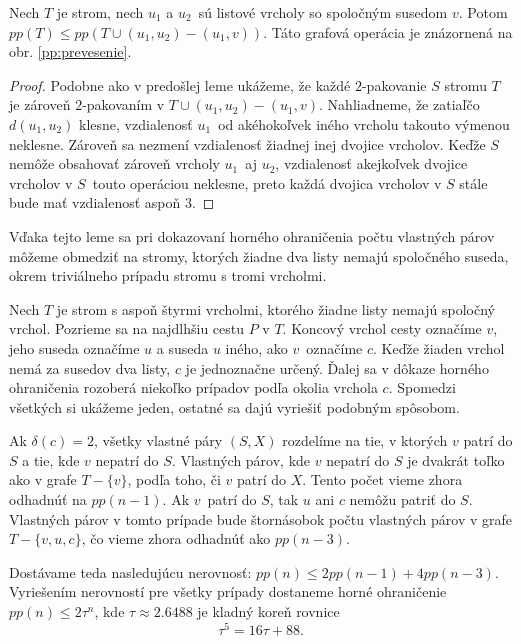 \begin{lema}
   Nech $T$ je strom, nech $u_1$ a $u_2$ sú listové vrcholy so spoločným susedom $v$. Potom
   $pp(T) \leq pp(T \cup (u_1, u_2) - (u_1, v))$. Táto grafová operácia je znázornená na
   obr. \ref{pp:prevesenie}.
\end{lema}

\begin{proof}
    Podobne ako v predošlej leme ukážeme, že každé $2$-pakovanie $S$ stromu $T$ je zároveň $2$-pakovaním
    v $T \cup (u_1, u_2) - (u_1, v)$. Nahliadneme, že zatiaľčo $d(u_1, u_2)$ klesne, vzdialenosť
    $u_1$ od akéhokoľvek iného vrcholu takouto výmenou neklesne. Zároveň sa nezmení vzdialenosť
    žiadnej inej dvojice vrcholov. Keďže $S$ nemôže obsahovať zároveň vrcholy $u_1$ aj $u_2$,
    vzdialenosť akejkoľvek dvojice vrcholov v $S$ touto operáciou neklesne, preto každá dvojica
    vrcholov v $S$ stále bude mať vzdialenosť aspoň $3$.
\end{proof}

Vďaka tejto leme sa pri dokazovaní horného ohraničenia počtu vlastných párov môžeme obmedziť
na stromy, ktorých žiadne dva listy nemajú spoločného suseda, okrem triviálneho prípadu
stromu s tromi vrcholmi.

Nech $T$ je strom s aspoň štyrmi vrcholmi, ktorého žiadne listy nemajú spoločný vrchol. Pozrieme
sa na najdlhšiu cestu $P$ v $T$. Koncový vrchol cesty označíme $v$, jeho suseda označíme $u$ a suseda $u$
iného, ako $v$ označíme $c$. Keďže žiaden vrchol nemá za susedov dva listy, $c$ je jednoznačne určený.
Ďalej sa v dôkaze horného ohraničenia rozoberá niekoľko prípadov podľa okolia vrchola $c$. Spomedzi
všetkých si ukážeme jeden, ostatné sa dajú vyriešiť podobným spôsobom.

Ak $\delta(c) = 2$, všetky vlastné páry $(S,X)$ rozdelíme na tie,
v ktorých $v$ patrí do $S$ a tie, kde $v$ nepatrí do $S$. Vlastných párov, kde $v$ nepatrí do $S$ je
dvakrát toľko ako v grafe $T - \{v\}$, podľa toho, či $v$ patrí do $X$. Tento počet vieme zhora
odhadnúť na $pp(n-1)$. Ak $v$ patrí do $S$, tak $u$ ani $c$ nemôžu patriť do $S$. Vlastných párov
v tomto prípade bude štornásobok počtu vlastných párov v grafe $T - \{v, u, c\}$, čo vieme zhora
odhadnúť ako $pp(n-3)$.

Dostávame teda nasledujúcu nerovnosť: $pp(n) \leq 2pp(n-1) + 4 pp(n-3)$. Vyriešením nerovností pre
všetky prípady dostaneme horné ohraničenie $pp(n) \leq 2 \tau^n$\cite{junosza_fast}, kde $\tau \approx 2.6488$ je kladný koreň rovnice
$$\tau^5 = 16\tau + 88.$$

